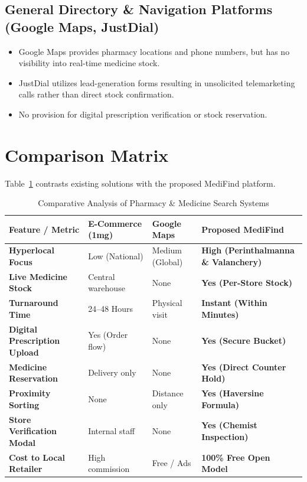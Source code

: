 \documentclass[12pt,a4paper]{report}
\begin{document}
\subsection{General Directory & Navigation Platforms (Google Maps, JustDial)}
\begin{itemize}
    \item Google Maps provides pharmacy locations and phone numbers, but has no visibility into real-time medicine stock.
    \item JustDial utilizes lead-generation forms resulting in unsolicited telemarketing calls rather than direct stock confirmation.
    \item No provision for digital prescription verification or stock reservation.
\end{itemize}

\section{Comparison Matrix}
Table~\ref{tab:comparison} contrasts existing solutions with the proposed MediFind platform.

\begin{table}[htbp]
\centering
\caption{Comparative Analysis of Pharmacy & Medicine Search Systems}
\label{tab:comparison}
\begin{tabular}{p{4.2cm}p{3.2cm}p{3.2cm}p{4.2cm}}
\toprule
\textbf{Feature / Metric} & \textbf{E-Commerce (1mg)} & \textbf{Google Maps} & \textbf{Proposed MediFind} \\
\midrule
\textbf{Hyperlocal Focus} & Low (National) & Medium (Global) & \textbf{High (Perinthalmanna \& Valanchery)} \\
\textbf{Live Medicine Stock} & Central warehouse & None & \textbf{Yes (Per-Store Stock)} \\
\textbf{Turnaround Time} & 24--48 Hours & Physical visit & \textbf{Instant (Within Minutes)} \\
\textbf{Digital Prescription Upload} & Yes (Order flow) & None & \textbf{Yes (Secure Bucket)} \\
\textbf{Medicine Reservation} & Delivery only & None & \textbf{Yes (Direct Counter Hold)} \\
\textbf{Proximity Sorting} & None & Distance only & \textbf{Yes (Haversine Formula)} \\
\textbf{Store Verification Modal} & Internal staff & None & \textbf{Yes (Chemist Inspection)} \\
\textbf{Cost to Local Retailer} & High commission & Free / Ads & \textbf{100\% Free Open Model} \\
\bottomrule
\end{tabular}
\end{table}
\end{document}
